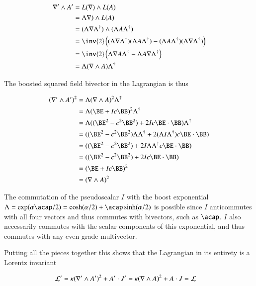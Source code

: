 \begin{align*}
\grad' \wedge A'
&= L(\grad) \wedge L(A) \\
&= \Lambda \grad) \wedge L(A) \\
&= (\Lambda \grad \Lambda^\dagger ) \wedge (\Lambda A \Lambda^\dagger) \\
&= \inv{2}\left( (\Lambda \grad \Lambda^\dagger )  (\Lambda A \Lambda^\dagger) - (\Lambda A \Lambda^\dagger )  (\Lambda \grad \Lambda^\dagger) \right) \\
&= \inv{2}\left( \Lambda \grad A \Lambda^\dagger - \Lambda A \grad \Lambda^\dagger \right) \\
&= \Lambda (\grad \wedge A) \Lambda^\dagger \\
\end{align*}

The boosted squared field bivector in the Lagrangian is thus

\begin{align*}
(\grad' \wedge A' )^2
&= \Lambda (\grad \wedge A)^2 \Lambda^\dagger \\
&= \Lambda (\BE + Ic\BB)^2 \Lambda^\dagger \\
&= \Lambda ( (\BE^2 - c^2\BB^2) + 2 I c \BE \cdot \BB ) \Lambda^\dagger \\
&= ( (\BE^2 - c^2\BB^2) \Lambda \Lambda^\dagger + 2 (\Lambda I \Lambda^\dagger) c \BE \cdot \BB ) \\
&= ( (\BE^2 - c^2\BB^2) + 2 I \Lambda \Lambda^\dagger c \BE \cdot \BB ) \\
&= ( (\BE^2 - c^2\BB^2) + 2 I c \BE \cdot \BB ) \\
&= (\BE + Ic\BB)^2 \\
&= (\grad \wedge A )^2
\end{align*}

The commutation of the pseudoscalar $I$ with the boost exponential $\Lambda = \exp( \alpha \acap/2 ) = \cosh(\alpha/2) + \acap\sinh(\alpha/2)$ is possible
since $I$
anticommutes with all four vectors and thus commutes with bivectors, such as $\acap$.  $I$ also necessarily commutes with the scalar
components of this exponential, and thus commutes with any even grade multivector.

Putting all the pieces together this shows that the Lagrangian in its entirety is a Lorentz invariant

\begin{align*}
\mathcal{L}' &= \kappa (\nabla' \wedge A')^2 + A' \cdot J' = \kappa (\nabla \wedge A)^2 + A \cdot J = \mathcal{L}
\end{align*}

